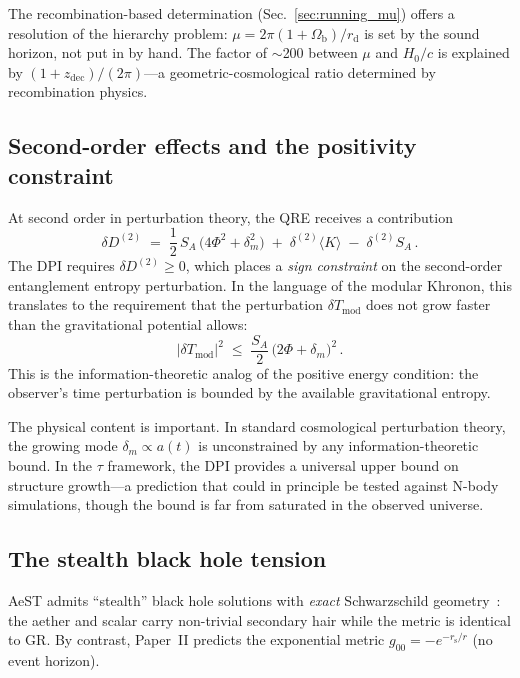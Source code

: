 \documentclass[prd,twocolumn,superscriptaddress,longbibliography,floatfix]{revtex4-2}
\newcommand{\abs}[1]{\left|#1\right|}
\newcommand{\tauasym}{\tau}
\newcommand{\rs}{r_{\mathrm{s}}}
\newcommand{\Tmod}{T_{\mathrm{mod}}}
\begin{document}
The recombination-based determination
(Sec.~\ref{sec:running_mu}) offers a resolution of
the hierarchy problem:
$\mu = 2\pi(1+\Omega_{\mathrm{b}})/r_{\mathrm{d}}$
is set by the sound horizon, not put in by hand.
The factor of $\sim$200 between $\mu$ and $H_0/c$ is
explained by $(1+z_{\mathrm{dec}})/(2\pi)$---a
geometric-cosmological ratio determined by
recombination physics.

\subsection{Second-order effects and the positivity constraint}

At second order in perturbation theory, the QRE receives a
contribution
\begin{equation}
\delta D^{(2)} \;=\; \frac{1}{2}\,S_A\,
\bigl(4\Phi^2 + \delta_m^2\bigr)
\;+\; \delta^{(2)}\!\langle K\rangle
\;-\; \delta^{(2)} S_A\,.
\label{eq:second_order}
\end{equation}
The DPI requires $\delta D^{(2)} \geq 0$, which places a
\emph{sign constraint} on the second-order entanglement
entropy perturbation.  In the language of the modular
Khronon, this translates to the requirement that the
perturbation $\delta\Tmod$ does not grow faster than the
gravitational potential allows:
\begin{equation}
\abs{\delta\Tmod}^2 \;\leq\; \frac{S_A}{2}\,
\bigl(2\Phi + \delta_m\bigr)^2\,.
\label{eq:positivity}
\end{equation}
This is the information-theoretic analog of the positive
energy condition: the observer's time perturbation is
bounded by the available gravitational entropy.

The physical content is important.  In standard
cosmological perturbation theory, the growing mode
$\delta_m \propto a(t)$ is unconstrained by any
information-theoretic bound.  In the $\tauasym$ framework,
the DPI provides a universal upper bound on
structure growth---a prediction that could in principle
be tested against N-body simulations, though the bound is
far from saturated in the observed universe.

\subsection{The stealth black hole tension}

AeST admits ``stealth'' black hole solutions with
\emph{exact} Schwarzschild
geometry~\cite{SkordisVokrouhlicky2024}: the aether and
scalar carry non-trivial secondary hair while the metric
is identical to GR.  By contrast, Paper~II predicts the
exponential metric $g_{00} = -e^{-\rs/r}$ (no event
horizon).
\end{document}
